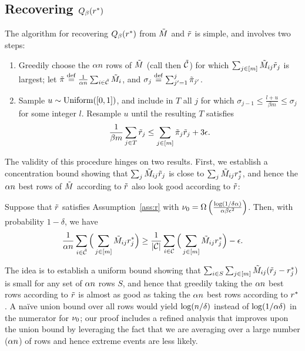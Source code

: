 \subsection{Recovering $Q_{\beta}(r^*)$}
\label{sec:approach-r}

The algorithm for recovering $Q_{\beta}(r^*)$ from $\tilde{M}$ and $\tilde{r}$ 
is simple, and involves two steps:
\begin{enumerate}
\item Greedily choose the $\alpha n$ rows of $\tilde{M}$ (call then $\tilde{\mathcal{C}}$) 
      for which $\sum_{j \in [m]} \tilde{M}_{ij}\tilde{r}_j$ is largest;
      let $\tilde{\pi} \stackrel{\rm def}{=} \frac{1}{\alpha n} \sum_{i \in \tilde{\mathcal{C}}} \tilde{M}_i$, and 
      $\sigma_j \stackrel{\rm def}{=} \sum_{j'=1}^j \tilde{\pi}_{j'}$.
\item Sample $u \sim \operatorname{Uniform}([0,1])$, and include in $T$ all $j$ for which 
      $\sigma_{j-1} \leq \frac{l + u}{\beta m} \leq \sigma_j$ 
      for some integer $l$. Resample $u$ until the resulting $T$ satisfies 
      \begin{equation}
      \label{eq:accept}
      \frac{1}{\beta m} \sum_{j \in T} \tilde{r}_j \leq \sum_{j \in [m]} \tilde{\pi}_j \tilde{r}_j + 3\epsilon.
      \end{equation}
\end{enumerate}
The validity of this procedure hinges on two results. First, we establish 
a concentration bound showing that $\sum_j \tilde{M}_{ij}\tilde{r}_j$ is close to 
$\sum_j \tilde{M}_{ij}r^*_j$, and hence the $\alpha n$ best rows of $\tilde{M}$ 
according to $\tilde{r}$ also look good according to $\tilde{r}$:
\begin{proposition}
\label{prop:robs-rtrue}
Suppose that $\tilde{r}$ satisfies Assumption~\ref{ass:r} with 
$\nu_0 = \Omega\left( \frac{\log(1/\delta\alpha)}{\alpha\beta\epsilon^2} \right)$. 
Then, with probability $1-\delta$, we have
\begin{equation}
\label{eq:robs-rtrue}
\frac{1}{\alpha n} \sum_{i \in \tilde{\mathcal{C}}} \Big(\sum_{j \in [m]} \tilde{M}_{ij}r^*_j\Big) \geq \frac{1}{|\mathcal{C}|} \sum_{i \in \mathcal{C}} \Big(\sum_{j \in [m]} \tilde{M}_{ij}r^*_j\Big) - \epsilon.
\end{equation}
\end{proposition}
The idea is to establish a uniform bound showing that 
$\sum_{i \in S} \sum_{j \in [m]} \tilde{M}_{ij}(\tilde{r}_j - r^*_j)$ is small for any 
set of $\alpha n$ rows $S$, and hence that greedily taking the $\alpha n$ 
best rows according to $\tilde{r}$ is almost as good as taking the $\alpha n$ 
best rows according to $r^*$. A na\"{i}ve union bound over all rows would 
yield $\log(n/\delta)$ instead of $\log(1/\alpha\delta)$ in the numerator 
for $\nu_0$; our proof includes a refined analysis that improves upon the union 
bound by leveraging the fact that we are averaging over a large number 
($\alpha n$) of rows and hence extreme events are less likely.

